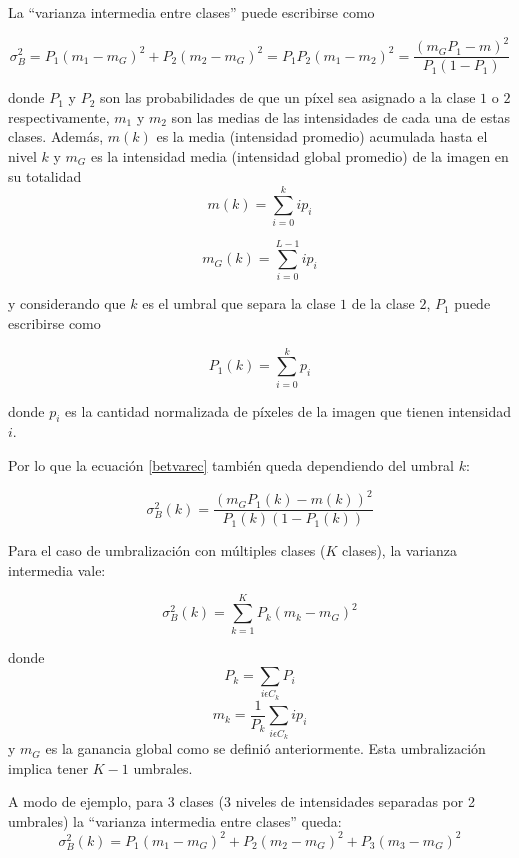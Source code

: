 La ``varianza intermedia entre clases'' puede escribirse como

\begin{equation}
{\sigma}_B^2 = P_1(m_1-m_G)^2 + P_2(m_2-m_G)^2 = P_1P_2(m_1-m_2)^2 = \frac{(m_GP_1 - m)^2}{P_1(1-P_1)}
\label{betvarec}
\end{equation}

donde $P_1$ y $P_2$ son las probabilidades de que un píxel sea asignado a la clase $1$ o $2$ respectivamente, $m_1$ y $m_2$ son las medias de las intensidades de cada una de estas clases. Además, $m(k)$ es la media (intensidad promedio) acumulada  hasta el nivel $k$ y $m_G$ es la intensidad media (intensidad global promedio) de la imagen en su totalidad
\begin{equation}
m(k) = \sum_{i=0}^{k}ip_i
\label{mediacumulativa}
\end{equation}

\begin{equation}
m_G(k) = \sum_{i=0}^{L-1}ip_i
\label{mediaglobal}
\end{equation}

y considerando que $k$ es el umbral que separa la clase $1$ de la clase $2$, $P_1$ puede escribirse como

\begin{equation}
 P_1(k) = \sum_{i=0}^kp_i 
 \label{peuno}
\end{equation}

donde $p_i$ es la cantidad normalizada de píxeles de la imagen que tienen intensidad $i$.

Por lo que la ecuación \ref{betvarec} también queda dependiendo del umbral $k$:

\begin{equation}
{\sigma}_B^2(k) = \frac{(m_GP_1(k) - m(k))^2}{P_1(k)(1-P_1(k))}
\label{betvarec2}
\end{equation}

Para el caso de umbralización con múltiples clases ($K$ clases), la varianza intermedia vale:

\begin{equation}
  {\sigma}_B^2(k) = \sum_{k=1}^{K}P_k(m_k-m_G)^2
  \label{betvarec3}
\end{equation}

donde $$P_k=\sum_{i{\epsilon}C_k}P_i$$ $$m_k = \frac{1}{P_k}\sum_{i{\epsilon}C_k}ip_i$$ y $m_G$ es la ganancia global como se definió anteriormente. Esta umbralización implica tener $K-1$ umbrales.

A modo de ejemplo, para 3 clases (3 niveles de intensidades separadas por 2 umbrales) la ``varianza intermedia entre clases'' queda:
\begin{equation}
  {\sigma}_B^2(k) = P_1(m_1 - m_G)^2 + P_2(m_2 - m_G)^2 + P_3(m_3 - m_G)^2
\end{equation}

